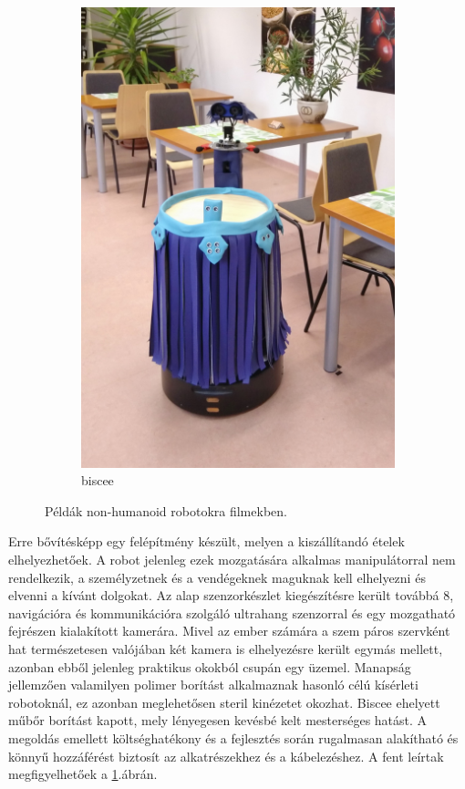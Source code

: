 \begin{figure}
\begin{subfigure}[b]{0.25\linewidth}
        \includegraphics[width=\linewidth]{figures/biscee_frontal.jpg}
    \caption{biscee}
    \label{fig:biscee}
    \end{subfigure}
    \caption{Példák non-humanoid robotokra filmekben.}
    \label{fig:base_and_biscee}
\end{figure}
Erre bővítésképp egy felépítmény készült, melyen a kiszállítandó ételek elhelyezhetőek. A robot jelenleg ezek mozgatására alkalmas manipulátorral nem rendelkezik, a személyzetnek és a vendégeknek maguknak kell elhelyezni és elvenni a kívánt dolgokat. Az alap szenzorkészlet kiegészítésre került továbbá 8, navigációra és kommunikációra szolgáló ultrahang szenzorral és egy mozgatható fejrészen kialakított kamerára. Mivel az ember számára a szem páros szervként hat természetesen valójában két kamera is elhelyezésre került egymás mellett, azonban ebből jelenleg praktikus okokból csupán egy üzemel. Manapság jellemzően valamilyen polimer borítást alkalmaznak hasonló célú kísérleti robotoknál, ez azonban meglehetősen steril kinézetet okozhat. Biscee ehelyett műbőr borítást kapott, mely lényegesen kevésbé kelt mesterséges hatást. A megoldás emellett költséghatékony és a fejlesztés során rugalmasan alakítható és könnyű hozzáférést biztosít az alkatrészekhez és a kábelezéshez. A fent leírtak megfigyelhetőek a \ref{fig:biscee}.ábrán.

